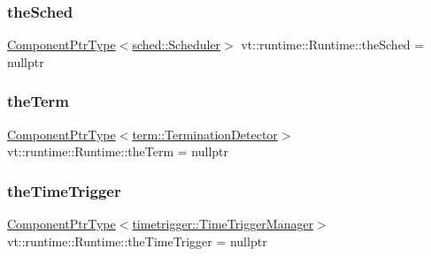 \mbox{\label{structvt_1_1runtime_1_1_runtime_ae9d0dc11ee40a455a64982eec66e3a26}} 
\subsubsection{\texorpdfstring{the\+Sched}{theSched}}
{\footnotesize\ttfamily \hyperlink{structvt_1_1runtime_1_1_runtime_a0893bf0a8c03b898e8ab66b52cec80ad}{Component\+Ptr\+Type}$<$\hyperlink{structvt_1_1sched_1_1_scheduler}{sched\+::\+Scheduler}$>$ vt\+::runtime\+::\+Runtime\+::the\+Sched = nullptr}

\mbox{\label{structvt_1_1runtime_1_1_runtime_a365e1addbed82440bb014f97b1c839f6}} 
\subsubsection{\texorpdfstring{the\+Term}{theTerm}}
{\footnotesize\ttfamily \hyperlink{structvt_1_1runtime_1_1_runtime_a0893bf0a8c03b898e8ab66b52cec80ad}{Component\+Ptr\+Type}$<$\hyperlink{structvt_1_1term_1_1_termination_detector}{term\+::\+Termination\+Detector}$>$ vt\+::runtime\+::\+Runtime\+::the\+Term = nullptr}

\mbox{\label{structvt_1_1runtime_1_1_runtime_a3d72d73ecd4ba3f0104dca596eae3862}} 
\subsubsection{\texorpdfstring{the\+Time\+Trigger}{theTimeTrigger}}
{\footnotesize\ttfamily \hyperlink{structvt_1_1runtime_1_1_runtime_a0893bf0a8c03b898e8ab66b52cec80ad}{Component\+Ptr\+Type}$<$\hyperlink{structvt_1_1timetrigger_1_1_time_trigger_manager}{timetrigger\+::\+Time\+Trigger\+Manager}$>$ vt\+::runtime\+::\+Runtime\+::the\+Time\+Trigger = nullptr}

